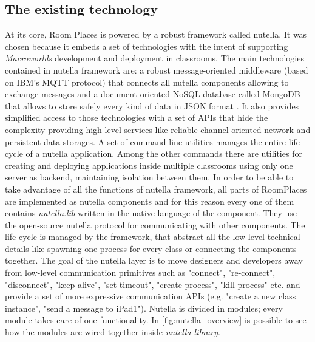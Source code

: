\subsection{The existing technology}
At its core, Room Places is powered by a robust framework called nutella. It was chosen because it embeds a set of technologies with the intent of supporting \textit{Macroworlds} \cite{gnoli:nutella} development and deployment in classrooms. The main technologies contained in nutella framework are: a robust message-oriented middleware (based on IBM's MQTT protocol) that connects all nutella components allowing to exchange messages and a document oriented NoSQL database called MongoDB that allows to store safely every kind of data in JSON format \cite{JSON}. It also provides simplified access to those technologies with a set of APIs that hide the complexity providing high level services like reliable channel oriented network and persistent data storages. A set of command line utilities manages the entire life cycle of a nutella application. Among the other commands there are utilities for creating and deploying applications inside multiple classrooms using only one server as backend, maintaining isolation between them. In order to be able to take advantage of all the functions of nutella framework, all parts of RoomPlaces are implemented as nutella components and for this reason every one of them contains \textit{nutella.lib} written in the native language of the component. They use the open-source nutella protocol for communicating with other components. The life cycle is managed by the framework, that abstract all the low level technical details like spawning one process for every class or connecting the components together. The goal of the nutella layer is to move designers and developers away from low-level communication primitives such as "connect", "re-connect", "disconnect", "keep-alive", "set timeout", "create process", "kill process" etc. and provide a set of more expressive communication APIs (e.g. "create a new class instance", "send a message to iPad1"). Nutella is divided in modules; every module takes care of one functionality. In \ref{fig:nutella_overview} is possible to see how the modules are wired together inside \textit{nutella library}.

